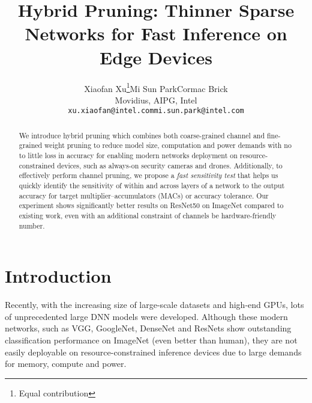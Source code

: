 \documentclass{article}
\title{Hybrid Pruning: Thinner Sparse Networks for Fast Inference on Edge Devices}
\author{
  Xiaofan Xu\thanks{Equal contribution}\qquad Mi Sun Park\footnotemark[1] \qquad Cormac Brick\\
  Movidius, AIPG, Intel\\
  \texttt{xu.xiaofan@intel.com\qquad mi.sun.park@intel.com} \\
}
\begin{document}

\maketitle

\begin{abstract}
We introduce hybrid pruning which combines both coarse-grained channel and fine-grained weight pruning to reduce model size, computation and power demands with no to little loss in accuracy for enabling modern networks deployment on resource-constrained devices, such as always-on security cameras and drones. Additionally, to effectively perform channel pruning, we propose a \textit{fast sensitivity test} that helps us quickly identify the sensitivity of within and across layers of a network to the output accuracy for target multiplier–accumulators (MACs) or accuracy tolerance. Our experiment shows significantly better results on ResNet50 on ImageNet compared to existing work, even with an additional constraint of channels be hardware-friendly number.
\end{abstract}
\vspace{-5mm}
\section{Introduction}
Recently, with the increasing size of large-scale datasets and high-end GPUs, lots of unprecedented large DNN models were developed. Although these modern networks, such as VGG\cite{simonyan2014very}, GoogleNet\cite{szegedy2015going}, DenseNet\cite{huang2017densely} and ResNets\cite{he2016deep} show outstanding classification performance on ImageNet (even better than human), they are not easily deployable on resource-constrained inference devices due to large demands for memory, compute and power. 
\end{document}
